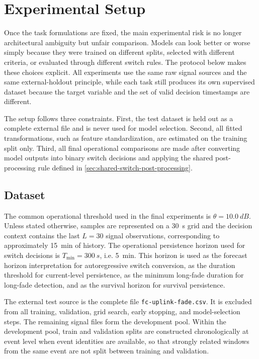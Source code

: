 \chapter{Experimental Setup}
\label{chap:experimental-setup}

Once the task formulations are fixed, the main experimental risk is no longer
architectural ambiguity but unfair comparison. Models can look better or worse
simply because they were trained on different splits, selected with different
criteria, or evaluated through different switch rules. The protocol below makes
these choices explicit. All experiments use the same raw signal sources and the
same external-holdout principle, while each task still produces its own
supervised dataset because the target variable and the set of valid decision
timestamps are different.

The setup follows three constraints. First, the test dataset is held out as a
complete external file and is never used for model selection. Second, all fitted
transformations, such as feature standardization, are estimated on the training
split only. Third, all final operational comparisons are made after converting
model outputs into binary switch decisions and applying the shared
post-processing rule defined in \cref{sec:shared-switch-post-processing}.

\section{Dataset}
\label{sec:experimental-dataset-configuration}

The common operational threshold used in the final experiments is
\(\theta=\SI{10.0}{dB}\). Unless stated otherwise, samples are represented on a
\SI{30}{s} grid and the decision context contains the last \(L=30\) signal
observations, corresponding to approximately \SI{15}{min} of history. The
operational persistence horizon used for switch decisions is
\(T_{\min}=\SI{300}{s}\), i.e. \SI{5}{min}. This horizon is used as the forecast
horizon interpretation for autoregressive switch conversion, as the duration
threshold for current-level persistence, as the minimum long-fade duration for
long-fade detection, and as the survival horizon for survival persistence.

The external test source is the complete file
\texttt{fc-uplink-fade.csv}. It is excluded from all training, validation, grid
search, early stopping, and model-selection steps. The remaining signal files
form the development pool. Within the development pool, train and validation
splits are constructed chronologically at event level when event identities are
available, so that strongly related windows from the same event are not split
between training and validation.

